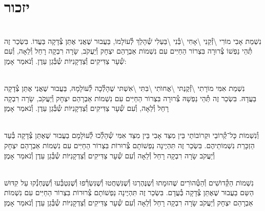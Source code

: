 \documentclass[twoside, openany, parskip=half, 11pt]{book}
\begin{document}
\vfill
{}


\sepline



\chapter[יזכור]{ יזכור }

 

\\
נִשְׁמַת אָבִי מוֹרִי \textbackslash זְ֯קֵנִי \textbackslash אָחִי \textbackslash בְּ֯נִי \textbackslash בַּעְלִי  שְׁ֯הָלַךְ לְ֯עוֹלָמוֹ, בַּעֲבוּר שֶׁאֲנִי אֶתֵּן צְ֯דָקָה בַּעֲדוֹ. בִּשְׂכַר זֶה תְּ֯הֵי נַפְשׁוֹ צְ֯רוּרָה בִּצְרוֹר הַחַיִּים עִם נִשְׁמוֹת אַבְרָהַם יִצְחָק וְ֯יַעֲקֹב, שָׂרָה רִבְקָה רָחֵל וְ֯לֵאָה, וְ֯עִם שְׁ֯עָר צַדִּיקִים וְ֯צַדְקָנִיּוֹת שְ֯בְּ֯גַן עֵדֶן. וְ֯נֹאמַר אָמֶן:

\\
נִשְׁמַת אִמִּי מוֹרָתִי \textbackslash זְ֯קֶנְתּי \textbackslash אֲחוׂתִי \textbackslash בִּתִּי \textbackslash אִשְׁתּי
שֶׁהָלְ֯כָה לְ֯עוֹלָמָהּ, בַּעֲבוּר שֶׁאֲנִי אֶתֵּן צְ֯דָקָה בַּעֲדָהּ. בִּשְׂכַר זֶה תְּ֯הֵי נַפְשָׁהּ צְ֯רוּרָה בִּצְרוֹר הַחַיִּים עִם נִשְׁמוֹת אַבְרָהַם יִצְחָק וְ֯יַעֲקֹב, שָׂרָה רִבְקָה רָחֵל וְ֯לֵאָה, וְ֯עִם שְׁ֯עָר צַדִּיקִים וְ֯צַדְקָנִיּוֹת שְ֯בְּ֯גַן עֵדֶן. וְ֯נֹאמַר אָמֶן׃

 \\
וְ֯נִשְׁמוֹת כָּל־קְ֯רוֹבַי וּקְרוֹבוֹתַי בֵּין מִצַּד אָבִי בֵּין מִצַּד אִמִּי
שְׁ֯הָלְ֯כוּ לְ֯עוׂלָמָם
בַעֲבוּר שֶׁאֶתֵּן צְ֯דָקָה בְּ֯עַד הַזְכָּרַת נִשְׁמוֹתֵיהֶם. בִּשְׂכַר זֶה תִּהְיֶינָה נַפְשׁוֹתָם צְ֯רוּרוֹת בִּצְרוֹר הַחַיִּים עִם נִשְׁמוֹת אַבְרָהַם יִצְחָק וְ֯יַעֲקֹב שָׂרָה רִבְקָה רָחֵל וְ֯לֵאָה וְ֯עִם שְׁ֯עָר צַדִּיקִים וְ֯צַדְקָנִיּוֹת שְ֯בְּ֯גַן עֵדֶן וְ֯נֹאמַר אָמֶן׃



\\
נִשְׁמוׂת הַקְּ֯דוׂשִׁים וְ֯הַטְּ֯הוׂרִים
שֶׁהוּמָתוּ וְ֯שֶנֶּהֶרְגוּ וְ֯שֶׁנִּשְׁחֲטוּ וְ֯שֶׁנִּשְׂרְ֯פוּ וְ֯שֶׁנִּטְבְּ֯עוּ וְ֯שֶׁנֶּחְנְ֯קוּ עַל קִדּוּשׁ הַשֵּם בַעֲבוּר שֶׁאֶתֵּן צְ֯דָקָה בְּ֯עֲדָם. בִּשְׂכַר זֶה תִּהְיֶינָה נַפְשׁוֹתָם צְ֯רוּרוֹת בִּצְרוֹר הַחַיִּים עִם נִשְׁמוֹת אַבְרָהַם יִצְחָק וְ֯יַעֲקֹב שָׂרָה רִבְקָה רָחֵל וְ֯לֵאָה וְ֯עִם שְׁ֯עָר צַדִּיקִים וְ֯צַדְקָנִיּוֹת שְ֯בְּ֯גַן עֵדֶן וְ֯נֹאמַר אָמֶן׃
%
%
%
\end{document}
